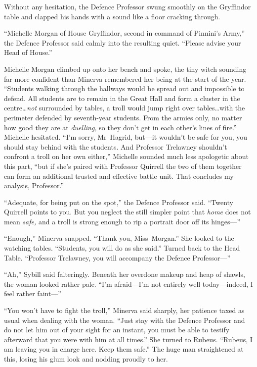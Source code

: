Without any hesitation, the Defence Professor swung smoothly on the Gryffindor
table and clapped his hands with a sound like a floor cracking through.

“Michelle Morgan of House Gryffindor, second in command of Pinnini’s Army,” the
Defence Professor said calmly into the resulting quiet. “Please advise your
Head of House.”

Michelle Morgan climbed up onto her bench and spoke, the tiny witch sounding
far more confident than Minerva remembered her being at the start of the year.
“Students walking through the hallways would be spread out and impossible to
defend. All students are to remain in the Great Hall and form a cluster in the
centre…\emph{not} surrounded by tables, a troll would jump right over
tables…with the perimeter defended by seventh-year students. From the
armies only, no matter how good they are at \emph{duelling,} so they don’t get
in each other’s lines of fire.” Michelle hesitated. “I’m sorry, Mr~Hagrid,
but—it wouldn’t be safe for you, you should stay behind with the students.
And Professor Trelawney shouldn’t confront a troll on her own either,” Michelle
sounded much less apologetic about this part, “but if she’s paired with
Professor Quirrell the two of them together can form an additional trusted and
effective battle unit. That concludes my analysis, Professor.”

“Adequate, for being put on the spot,” the Defence Professor said. “Twenty
Quirrell points to you. But you neglect the still simpler point that
\emph{home} does not mean \emph{safe,} and a troll is strong enough to rip a
portrait door off its hinges—”

“Enough,” Minerva snapped. “Thank you, Miss~Morgan.” She looked to the watching
tables. “Students, you will do as she said.” Turned back to the Head Table.
“Professor Trelawney, you will accompany the Defence Professor—”

“Ah,” Sybill said falteringly. Beneath her overdone makeup and heap of shawls,
the woman looked rather pale. “I’m afraid—I’m not entirely well
today—indeed, I feel rather faint—”

“You won’t have to fight the troll,” Minerva said sharply, her patience taxed
as usual when dealing with the woman. “Just stay with the Defence Professor and
do not let him out of your sight for an instant, you must be able to testify
afterward that you were with him at all times.” She turned to Rubeus.
“Rubeus, I am leaving you in charge here. Keep them safe.” The huge man
straightened at this, losing his glum look and nodding proudly to her.

